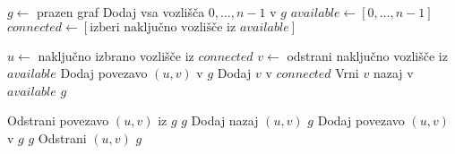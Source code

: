\documentclass{article}
\begin{document}
    \begin{algorithmic}[1]
    
        \State $g \gets$ prazen graf
        \State Dodaj vsa vozlišča $0, \dots, n-1$ v $g$
        \State $available \gets [0, \dots, n-1]$
        \State $connected \gets [\text{izberi naključno vozlišče iz } available]$
        
            \State $u \gets$ naključno izbrano vozlišče iz $connected$
            \State $v \gets$ odstrani naključno vozlišče iz $available$
                \State Dodaj povezavo $(u, v)$ v $g$
                \State Dodaj $v$ v $connected$
            \Else
                \State Vrni $v$ nazaj v $available$
            \EndIf
        \EndWhile
        \State \Return $g$
    \EndFunction
    
            \State Odstrani povezavo $(u, v)$ iz $g$
                \State \Return $g$
            \Else
                \State Dodaj nazaj $(u, v)$
                \State \Return $g$
            \EndIf
        \Else
            \State Dodaj povezavo $(u, v)$ v $g$
                \State \Return $g$
            \Else
                \State Odstrani $(u, v)$
                \State \Return $g$ 
            \EndIf
        \EndIf
    \EndFunction 
    
    \end{algorithmic}

    \vspace*{1cm}
   
\end{document}
